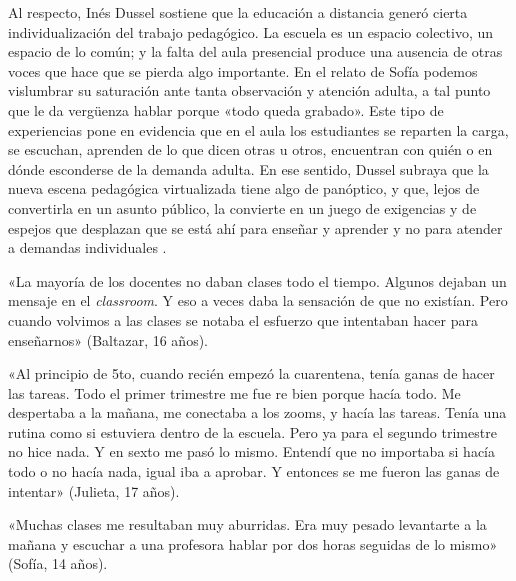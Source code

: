 \begin{refsection}
Al respecto, Inés Dussel \protect\parencite*{4197-DUSSEL2020} sostiene que la educación a distancia generó cierta individualización del trabajo pedagógico. La escuela es un espacio colectivo, un espacio de lo común; y la falta del aula presencial produce una ausencia de otras voces que hace que se pierda algo importante. En el relato de Sofía podemos vislumbrar su saturación ante tanta observación y atención adulta, a tal punto que le da vergüenza hablar porque «todo queda grabado». Este tipo de experiencias pone en evidencia que en el aula los estudiantes se reparten la carga, se escuchan, aprenden de lo que dicen otras u otros, encuentran con quién o en dónde esconderse de la demanda adulta. En ese sentido, Dussel subraya que la nueva escena pedagógica virtualizada tiene algo de panóptico, y que, lejos de convertirla en un asunto público, la convierte en un juego de exigencias y de espejos que desplazan que se está ahí para enseñar y aprender y no para atender a demandas individuales \protect\parencite[pág.~5]{4197-DUSSEL2020}.


\begin{gbcita}
«La mayoría de los docentes no daban clases todo el tiempo. Algunos dejaban un mensaje en el \emph{classroom}. Y eso a veces daba la sensación de que no existían. Pero cuando volvimos a las clases se notaba el esfuerzo que intentaban hacer para enseñarnos» (Baltazar, 16 años).

«Al principio de 5to, cuando recién empezó la cuarentena, tenía ganas de hacer las tareas. Todo el primer trimestre me fue re bien porque hacía todo. Me despertaba a la mañana, me conectaba a los zooms, y hacía las tareas. Tenía una rutina como si estuviera dentro de la escuela. Pero ya para el segundo trimestre no hice nada. Y en sexto me pasó lo mismo. Entendí que no importaba si hacía todo o no hacía nada, igual iba a aprobar. Y entonces se me fueron las ganas de intentar» (Julieta, 17 años).

«Muchas clases me resultaban muy aburridas. Era muy pesado levantarte a la mañana y escuchar a una profesora hablar por dos horas seguidas de lo mismo» (Sofía, 14 años).

\end{gbcita}


\end{refsection}
